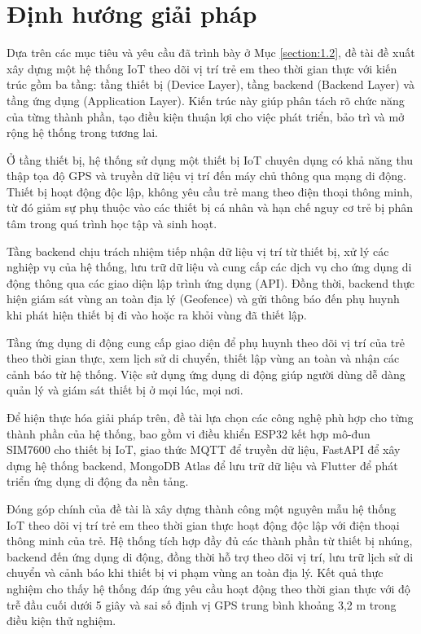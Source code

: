 \documentclass[../DoAn.tex]{subfiles}
\begin{document}
\section{Định hướng giải pháp}
\label{section:1.3}

Dựa trên các mục tiêu và yêu cầu đã trình bày ở Mục \ref{section:1.2}, đề tài đề xuất xây dựng một hệ thống IoT theo dõi vị trí trẻ em theo thời gian thực với kiến trúc gồm ba tầng: tầng thiết bị (Device Layer), tầng backend (Backend Layer) và tầng ứng dụng (Application Layer). Kiến trúc này giúp phân tách rõ chức năng của từng thành phần, tạo điều kiện thuận lợi cho việc phát triển, bảo trì và mở rộng hệ thống trong tương lai.

Ở tầng thiết bị, hệ thống sử dụng một thiết bị IoT chuyên dụng có khả năng thu thập tọa độ GPS và truyền dữ liệu vị trí đến máy chủ thông qua mạng di động. Thiết bị hoạt động độc lập, không yêu cầu trẻ mang theo điện thoại thông minh, từ đó giảm sự phụ thuộc vào các thiết bị cá nhân và hạn chế nguy cơ trẻ bị phân tâm trong quá trình học tập và sinh hoạt.

Tầng backend chịu trách nhiệm tiếp nhận dữ liệu vị trí từ thiết bị, xử lý các nghiệp vụ của hệ thống, lưu trữ dữ liệu và cung cấp các dịch vụ cho ứng dụng di động thông qua các giao diện lập trình ứng dụng (API). Đồng thời, backend thực hiện giám sát vùng an toàn địa lý (Geofence) và gửi thông báo đến phụ huynh khi phát hiện thiết bị đi vào hoặc ra khỏi vùng đã thiết lập.

Tầng ứng dụng di động cung cấp giao diện để phụ huynh theo dõi vị trí của trẻ theo thời gian thực, xem lịch sử di chuyển, thiết lập vùng an toàn và nhận các cảnh báo từ hệ thống. Việc sử dụng ứng dụng di động giúp người dùng dễ dàng quản lý và giám sát thiết bị ở mọi lúc, mọi nơi.

Để hiện thực hóa giải pháp trên, đề tài lựa chọn các công nghệ phù hợp cho từng thành phần của hệ thống, bao gồm vi điều khiển ESP32 kết hợp mô-đun SIM7600 cho thiết bị IoT, giao thức MQTT để truyền dữ liệu, FastAPI để xây dựng hệ thống backend, MongoDB Atlas để lưu trữ dữ liệu và Flutter để phát triển ứng dụng di động đa nền tảng.

Đóng góp chính của đề tài là xây dựng thành công một nguyên mẫu hệ thống IoT theo dõi vị trí trẻ em theo thời gian thực hoạt động độc lập với điện thoại thông minh của trẻ. Hệ thống tích hợp đầy đủ các thành phần từ thiết bị nhúng, backend đến ứng dụng di động, đồng thời hỗ trợ theo dõi vị trí, lưu trữ lịch sử di chuyển và cảnh báo khi thiết bị vi phạm vùng an toàn địa lý. Kết quả thực nghiệm cho thấy hệ thống đáp ứng yêu cầu hoạt động theo thời gian thực với độ trễ đầu cuối dưới 5 giây và sai số định vị GPS trung bình khoảng 3,2 m trong điều kiện thử nghiệm.
\end{document}
